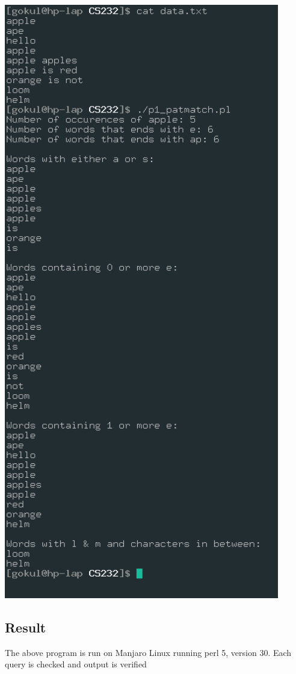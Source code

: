 \documentclass{article}
\begin{document}
\includegraphics[width=0.9\textwidth]{img/p15/ss.png}\newline

\subsection{Result}
The above program is run on Manjaro Linux running perl 5, version 30. 
Each query is checked and output is verified
\end{document}
